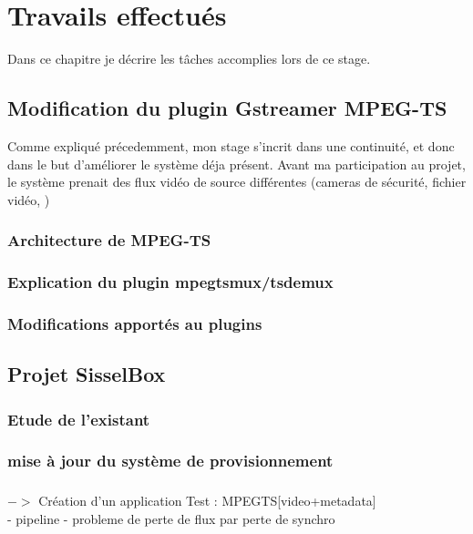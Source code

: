 \chapter{Travails effectués}
Dans ce chapitre je décrire les tâches accomplies lors de ce stage.
\section{Modification du plugin Gstreamer MPEG-TS}
Comme expliqué précedemment, mon stage s'incrit dans une continuité, et donc dans le but d'améliorer le système déja présent. Avant ma participation au projet, le système prenait des
flux vidéo de source différentes (cameras de sécurité, fichier vidéo, )

\subsection{Architecture de MPEG-TS}
\subsection{Explication du plugin mpegtsmux/tsdemux}
\subsection{Modifications apportés au plugins}

\section{Projet SisselBox}
 \subsection{Etude de l'existant}

 \subsection{mise à jour du système de provisionnement}

 \subsection{}
 $->$ Création d'un application Test : MPEGTS[video+metadata]\\
              - pipeline
              - probleme de perte de flux par perte de synchro
